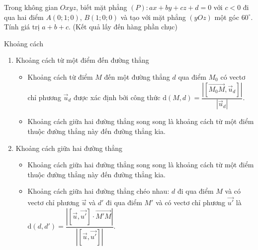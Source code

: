 \begin{ex}%
	Trong không gian $Oxyz$, biết mặt phẳng $(P)\colon ax+by+cz+d=0$ với $c<0$ đi qua hai điểm $A(0;1;0)$, $B(1;0;0)$ và tạo với mặt phẳng $(yOz)$ một góc $60^\circ $. Tính giá trị $a+b+c$. (Kết quả lấy đến hàng phần chục)
\end{ex}
\begin{dang}{Khoảng cách}
	\begin{enumerate}
		\item Khoảng cách từ một điểm đến đường thẳng
		\begin{itemize}
			\item Khoảng cách từ điểm $M$ đến một đường thẳng $d$ qua điểm $M_{0}$ có vectơ chỉ phương $\overrightarrow{u}_d$ được xác định bởi công thức $\mathrm{d}(M, d)=\dfrac{\left|\left[\overrightarrow{M_0 M}, \vec{u}_d\right]\right|}{\left|\vec{u}_d\right|}$.
			\item Khoảng cách giữa hai đường thẳng song song là khoảng cách từ một điểm thuộc đường thẳng này đến đường thẳng kia.
		\end{itemize}
		\item Khoảng cách giữa hai đường thẳng
		\begin{itemize}
			\item Khoảng cách giữa hai đường thẳng song song là khoảng cách từ một điểm thuộc đường thẳng này đến đường thẳng kia.
			\item Khoảng cách giữa hai đường thẳng chéo nhau: $d$ đi qua điểm $M$ và có vectơ chỉ phương $\overrightarrow{u}$ và $d'$ đi qua điểm $M'$ và có vectơ chỉ phương $\overrightarrow{u'}$ là $\mathrm{d}\left(d, d'\right)=\dfrac{\left|\left[\vec{u}, \vec{u'}\right] \cdot \overrightarrow{M'M}\right|}{\left|\left[\vec{u}, \vec{u'}\right]\right|}$.
		\end{itemize}
	\end{enumerate}
\end{dang}
